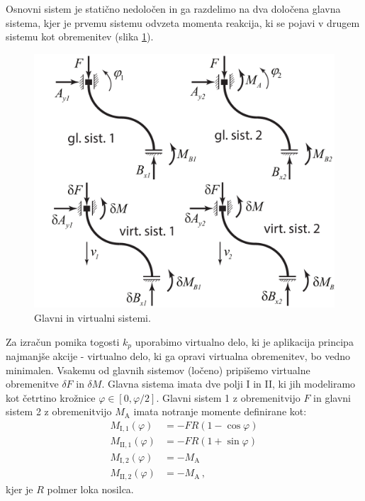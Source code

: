        Osnovni sistem je statično nedoločen in ga razdelimo na dva določena glavna sistema, kjer je prvemu sistemu odvzeta momenta reakcija, ki se pojavi v drugem sistemu kot obremenitev (slika \ref{fig:glavni in virtualni sistemi}).
        \begin{figure}[!hb]
                \centering
                \includegraphics[scale=0.32]{Magisterski praktikum/slike/teorija/pozitivni_nosilec_sistemi.pdf}
                \caption{Glavni in virtualni sistemi.}\label{fig:glavni in virtualni sistemi}
        \end{figure}
    
    
        \newpage
        Za izračun pomika togosti $k_p$ uporabimo virtualno delo, ki je aplikacija principa najmanjše akcije - virtualno delo, ki ga opravi virtualna obremenitev, bo vedno minimalen. Vsakemu od glavnih sistemov (ločeno) pripišemo virtualne obremenitve $\delta F$ in $\delta M$. Glavna sistema imata dve polji I in II, ki jih modeliramo kot četrtino krožnice  $\varphi \in [0, \varphi/2]$. Glavni sistem 1 z obremenitvijo $F$ in glavni sistem 2 z obremenitvijo $M_\text{A}$ imata notranje momente definirane kot:
        \begin{align}
            M_{\text{I},1}(\varphi) &= -FR (1-\cos\varphi) \nonumber \\ 
            M_{\text{II},1}(\varphi) &= -FR (1+\sin\varphi) \nonumber \\ 
            M_{\text{I},2}(\varphi) &= -M_\text{A} \nonumber \\ 
            M_{\text{II},2}(\varphi) &= -M_\text{A} \,,
        \end{align}
        kjer je $R$ polmer loka nosilca.  
        
